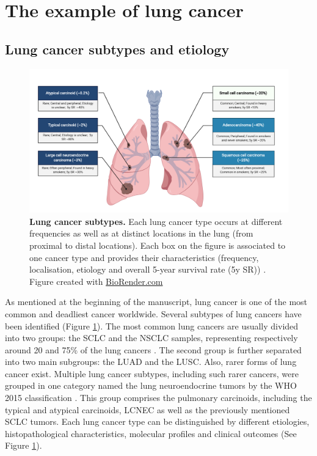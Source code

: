 

\section{The example of lung cancer}
\label{Intro-lung}
\subsection{Lung cancer subtypes and etiology}
\begin{figure}[H]
    \centering
    \includegraphics[width=1\textwidth]{Figures/Intro/Lung_cancer.pdf}
    \caption[Lung cancer subtypes]{\textbf{Lung cancer subtypes.} Each lung cancer type occurs at different frequencies as well as at distinct locations in the lung (from proximal to distal locations). Each box on the figure is associated to one cancer type and provides their characteristics (frequency, localisation, etiology and overall 5-year survival rate (5y SR)) \cite{Travis2010,Derks2018,Simbolo2019a,ASCO}. Figure created with \href{https://biorender.com/}{BioRender.com}}
    \label{fig:intro_lung}
\end{figure}
As mentioned at the beginning of the manuscript, lung cancer is one of the most common and deadliest cancer worldwide. Several subtypes of lung cancers have been identified (Figure \ref{fig:intro_lung}).
The most common lung cancers are usually divided into two groups: the \gls{SCLC} and the \gls{NSCLC} samples, representing respectively around 20 and 75\% of the lung cancers \cite{Politi2015}. The second group is further separated into two main subgroups: the \gls{LUAD} and the \gls{LUSC}. Also, rarer forms of lung cancer exist. Multiple lung cancer subtypes, including such rarer cancers, were grouped in one category named the lung neuroendocrine tumors by the \gls{WHO} 2015 classification \cite{Travis2015}. This group comprises the pulmonary carcinoids, including the typical and atypical carcinoids, \gls{LCNEC} as well as the previously mentioned \gls{SCLC} tumors. 
Each lung cancer type can be distinguished by different etiologies, histopathological characteristics, molecular profiles and clinical outcomes (See Figure \ref{fig:intro_lung}).

